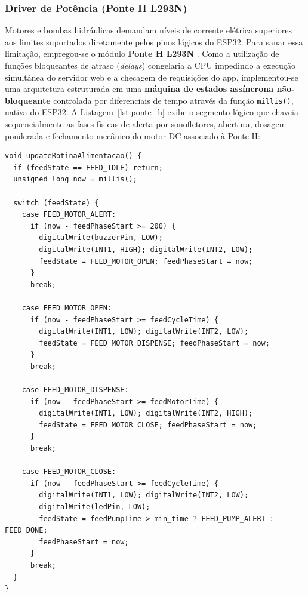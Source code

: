 \documentclass[12pt]{article}\usepackage{sbc-template}\usepackage{graphicx,url}\usepackage[utf8]{inputenc}
\begin{document}
\subsubsection{Driver de Potência (Ponte H L293N)}
Motores e bombas hidráulicas demandam níveis de corrente elétrica superiores aos limites suportados diretamente pelos pinos lógicos do ESP32. Para sanar essa limitação, empregou-se o módulo \textbf{Ponte H L293N} \cite{ti:l293n}. Como a utilização de funções bloqueantes de atraso (\textit{delays}) congelaria a CPU impedindo a execução simultânea do servidor web e a checagem de requisições do app, implementou-se uma arquitetura estruturada em uma \textbf{máquina de estados assíncrona não-bloqueante} controlada por diferenciais de tempo através da função \lstinline$millis()$, nativa do ESP32. A Listagem~\ref{lst:ponte_h} exibe o segmento lógico que chaveia sequencialmente as fases físicas de alerta por sonofletores, abertura, dosagem ponderada e fechamento mecânico do motor DC associado à Ponte H:

\begin{lstlisting}[caption={Controle assíncrono e não-bloqueante das fases do motor via Ponte H.}, label={lst:ponte_h}]
void updateRotinaAlimentacao() {
  if (feedState == FEED_IDLE) return;
  unsigned long now = millis();

  switch (feedState) {
    case FEED_MOTOR_ALERT:
      if (now - feedPhaseStart >= 200) {
        digitalWrite(buzzerPin, LOW);
        digitalWrite(INT1, HIGH); digitalWrite(INT2, LOW);
        feedState = FEED_MOTOR_OPEN; feedPhaseStart = now;
      }
      break;

    case FEED_MOTOR_OPEN:
      if (now - feedPhaseStart >= feedCycleTime) {
        digitalWrite(INT1, LOW); digitalWrite(INT2, LOW);
        feedState = FEED_MOTOR_DISPENSE; feedPhaseStart = now;
      }
      break;

    case FEED_MOTOR_DISPENSE:
      if (now - feedPhaseStart >= feedMotorTime) {
        digitalWrite(INT1, LOW); digitalWrite(INT2, HIGH);
        feedState = FEED_MOTOR_CLOSE; feedPhaseStart = now;
      }
      break;

    case FEED_MOTOR_CLOSE:
      if (now - feedPhaseStart >= feedCycleTime) {
        digitalWrite(INT1, LOW); digitalWrite(INT2, LOW);
        digitalWrite(ledPin, LOW);
        feedState = feedPumpTime > min_time ? FEED_PUMP_ALERT : FEED_DONE;
        feedPhaseStart = now;
      }
      break;
  }
}
\end{lstlisting}
\end{document}
